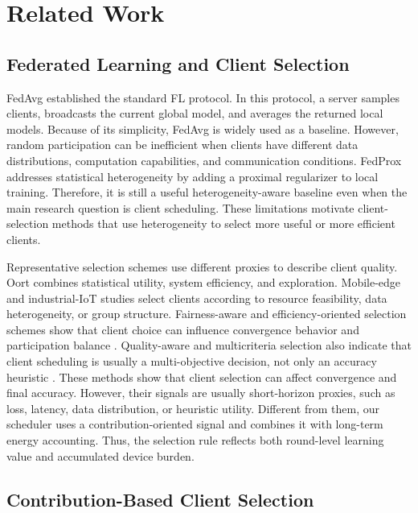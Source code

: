 \documentclass[journal]{IEEEtran}
\begin{document}
\section{Related Work}
\label{sec:related}

\subsection{Federated Learning and Client Selection}

FedAvg established the standard FL protocol. In this protocol, a server samples clients, broadcasts the current global model, and averages the returned local models. Because of its simplicity, FedAvg is widely used as a baseline. However, random participation can be inefficient when clients have different data distributions, computation capabilities, and communication conditions. FedProx \cite{li2020federated} addresses statistical heterogeneity by adding a proximal regularizer to local training. Therefore, it is still a useful heterogeneity-aware baseline even when the main research question is client scheduling. These limitations motivate client-selection methods that use heterogeneity to select more useful or more efficient clients.

Representative selection schemes use different proxies to describe client quality. Oort combines statistical utility, system efficiency, and exploration. Mobile-edge and industrial-IoT studies select clients according to resource feasibility, data heterogeneity, or group structure. Fairness-aware and efficiency-oriented selection schemes show that client choice can influence convergence behavior and participation balance \cite{huang2021efficiency}. Quality-aware and multicriteria selection also indicate that client scheduling is usually a multi-objective decision, not only an accuracy heuristic \cite{deng2022auction,abdulrahman2021fedmccs}. These methods show that client selection can affect convergence and final accuracy. However, their signals are usually short-horizon proxies, such as loss, latency, data distribution, or heuristic utility. Different from them, our scheduler uses a contribution-oriented signal and combines it with long-term energy accounting. Thus, the selection rule reflects both round-level learning value and accumulated device burden.

\subsection{Contribution-Based Client Selection}
\end{document}
